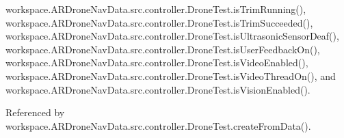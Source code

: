 workspace.\+A\+R\+Drone\+Nav\+Data.\+src.\+controller.\+Drone\+Test.\+is\+Trim\+Running(), workspace.\+A\+R\+Drone\+Nav\+Data.\+src.\+controller.\+Drone\+Test.\+is\+Trim\+Succeeded(), workspace.\+A\+R\+Drone\+Nav\+Data.\+src.\+controller.\+Drone\+Test.\+is\+Ultrasonic\+Sensor\+Deaf(), workspace.\+A\+R\+Drone\+Nav\+Data.\+src.\+controller.\+Drone\+Test.\+is\+User\+Feedback\+On(), workspace.\+A\+R\+Drone\+Nav\+Data.\+src.\+controller.\+Drone\+Test.\+is\+Video\+Enabled(), workspace.\+A\+R\+Drone\+Nav\+Data.\+src.\+controller.\+Drone\+Test.\+is\+Video\+Thread\+On(), and workspace.\+A\+R\+Drone\+Nav\+Data.\+src.\+controller.\+Drone\+Test.\+is\+Vision\+Enabled().



Referenced by workspace.\+A\+R\+Drone\+Nav\+Data.\+src.\+controller.\+Drone\+Test.\+create\+From\+Data().


